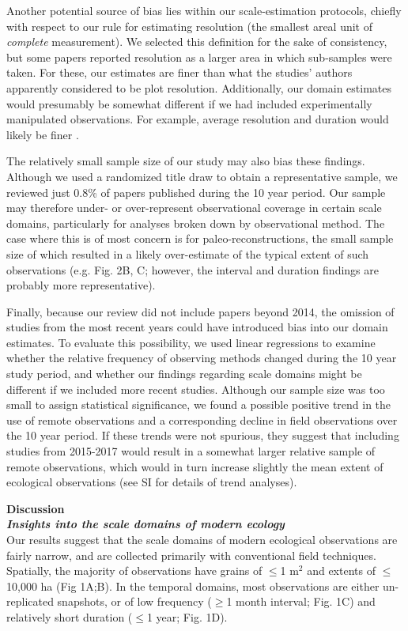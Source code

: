 \documentclass[12pt]{article}
\begin{document}
Another potential source of bias lies within our scale-estimation protocols, chiefly with respect to our rule for estimating resolution (the smallest areal unit of \emph{complete} measurement). We selected this definition for the sake of consistency, but some papers reported resolution as a larger area in which sub-samples were taken. For these, our estimates are finer than what the studies' authors apparently considered to be plot resolution. Additionally, our domain estimates would presumably be somewhat different if we had included experimentally manipulated observations. For example, average resolution and duration would likely be finer \cite{tilman_ecological_1989,kareiva_spatial_1988}.  

The relatively small sample size of our study may also bias these findings. Although we used a randomized title draw to obtain a representative sample, we reviewed just 0.8\% of papers published during the 10 year period. Our sample may therefore under- or over-represent observational coverage in certain scale domains, particularly for analyses broken down by observational method. The case where this is of most concern is for paleo-reconstructions, the small sample size of which resulted in a likely over-estimate of the typical extent of such observations (e.g. Fig. 2B, C; however, the interval and duration findings are probably more representative).     

Finally, because our review did not include papers beyond 2014, the omission of studies from the most recent years could have introduced bias into our domain estimates. To evaluate this possibility, we used linear regressions to examine whether the relative frequency of observing methods changed during the 10 year study period, and whether our findings regarding scale domains might be different if we included more recent studies. Although our sample size was too small to assign statistical significance, we found a possible positive trend in the use of remote observations and a corresponding decline in field observations over the 10 year period. If these trends were not spurious, they suggest that including studies from 2015-2017 would result in a somewhat larger relative sample of remote observations, which would in turn increase slightly the mean extent of ecological observations (see SI for details of trend analyses).   

\noindent \textbf{Discussion}\\
\noindent \textbf{\emph{Insights into the scale domains of modern ecology}}\\
Our results suggest that the scale domains of modern ecological observations are fairly narrow, and are collected primarily with conventional field techniques. Spatially, the majority of observations have grains of $\leq$1 m$^2$ and extents of $\leq$10,000 ha (Fig 1A;B). In the temporal domains, most observations are either un-replicated snapshots, or of low frequency ($\geq$1 month interval; Fig. 1C) and relatively short duration ($\leq$1 year; Fig. 1D). 
\end{document}
